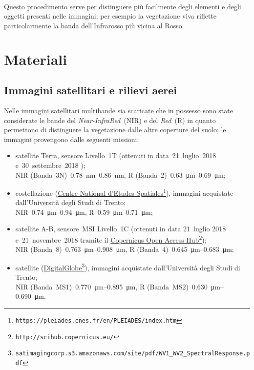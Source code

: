 %
\\
Questo procedimento serve per distinguere più facilmente degli elementi e degli oggetti presenti nelle immagini; per esempio la vegetazione viva riflette particolarmente la banda dell'Infrarosso più vicina al Rosso.



\section{Materiali}
\subsection{Immagini satellitari e rilievi aerei}
Nelle immagini satellitari multibande sia scaricate che in possesso sono state considerate le bande del \emph{Near-InfraRed}~(NIR) e del \emph{Red}~(R) in quanto permettono di distinguere la vegetazione dalle altre coperture del suolo;
le immagini provengono dalle seguenti missioni:
%
\begin{itemize}
	\item satellite Terra, sensore \AST{} Livello~1T (ottenuti in data~21~luglio~2018 e~30~settembre~2018 );  
		\\
		NIR (Banda~3N)~\SIrange[range-phrase={-}]{0.78}{0.86}{\nano\m}, R (Banda~2)~\SIrange[range-phrase={-}]{0.63}{0.69}{\micro\m};
	\item costellazione \Pl{} (\href{https://pleiades.cnes.fr/en/PLEIADES/index.htm}{Centre National d'Etudes Spatiales}\footnote{\texttt{https://pleiades.cnes.fr/en/PLEIADES/index.htm}}), immagini acquistate dall'Università degli Studi di Trento; 
		\\
		NIR~\SIrange[range-phrase={-}]{0.74}{0.94}{\micro\m}, R~\SIrange[range-phrase={-}]{0.59}{0.71}{\micro\m};
	\item satellite \Se{}A-B, sensore~MSI Livello~1C (ottenuti in data 21~luglio 2018 e~21~novembre~2018 tramite il \href{http://scihub.copernicus.eu/}{Copernicus Open Access Hub}\footnote{\texttt{http://scihub.copernicus.eu/}});
		\\
		NIR (Banda~8)~\SIrange[range-phrase={-}]{0.763}{0.908}{\micro\m}, R (Banda~4)~\SIrange[range-phrase={-}]{0.645}{0.683}{\micro\m};
	\item satellite \WV{} (\href{satimagingcorp.s3.amazonaws.com/site/pdf/WV1\_{}WV2\_{}SpectralResponse.pdf}{DigitalGlobe}\footnote{\texttt{satimagingcorp.s3.amazonaws.com/site/pdf/WV1\_{}WV2\_{}SpectralResponse.pdf}}), immagini acquistate dall'Università degli Studi di Trento;
		\\
		NIR (Banda~MS1)~\SIrange[range-phrase={-}]{0.770}{0.895}{\micro\m}, R (Banda~MS2)~\SIrange[range-phrase={-}]{0.630}{0.690}{\micro\m}.
\end{itemize}
